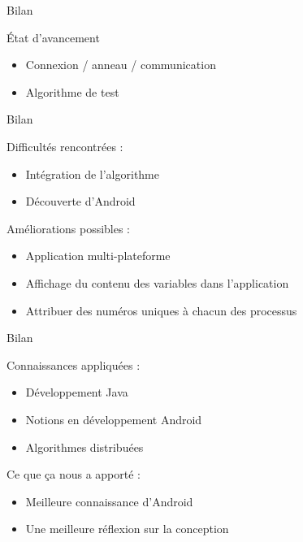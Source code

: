 \documentclass{beamer}
\begin{document}
    \begin{frame}{Bilan}
	  \begin{block}{État d'avancement}
	  \begin{itemize}
	   \item Connexion / anneau / communication
       \item Algorithme de test
	  \end{itemize}
	  \end{block}
    \end{frame}
    
    \begin{frame}{Bilan}

	  \begin{block}{Difficultés rencontrées :}
	  \begin{itemize}
	   \item Intégration de l'algorithme
       \item Découverte d'Android
	  \end{itemize}
	  \end{block}
	  \begin{block}{Améliorations possibles :}
	  \begin{itemize}
	   \item Application multi-plateforme
       \item Affichage du contenu des variables dans l'application
       \item Attribuer des numéros uniques à chacun des processus
	  \end{itemize}
	  \end{block}
    \end{frame}

    \begin{frame}{Bilan}
	  \begin{block}{Connaissances appliquées :}
	  \begin{itemize}
	   \item Développement Java
       \item Notions en développement Android
       \item Algorithmes distribuées
	  \end{itemize}
	  \end{block}
	  \begin{block}{Ce que ça nous a apporté :}
	  \begin{itemize}
	   \item Meilleure connaissance d’Android
       \item Une meilleure réflexion sur la conception
	  \end{itemize}
	  \end{block}
    \end{frame}
\end{document}
